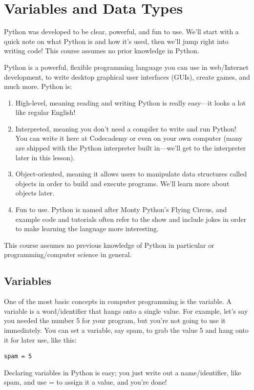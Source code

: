\documentclass[12pt,a4paper,final,twoside,onecolumn,titlepage]{book}
\begin{document}
\section{Variables and Data Types}
Python was developed to be clear, powerful, and fun to use. We'll start with a quick note on what Python is and how it's used, then we'll jump right into writing code! This course assumes no prior knowledge in Python.

Python is a powerful, flexible programming language you can use in web/Internet development, to write desktop graphical user interfaces (GUIs), create games, and much more. Python is:
\begin{enumerate}
\item High-level, meaning reading and writing Python is really easy—it looks a lot like regular English!
\item Interpreted, meaning you don't need a compiler to write and run Python! You can write it here at Codecademy or even on your own computer (many are shipped with the Python interpreter built in—we'll get to the interpreter later in this lesson).
\item Object-oriented, meaning it allows users to manipulate data structures called objects in order to build and execute programs. We'll learn more about objects later.
\item Fun to use. Python is named after Monty Python's Flying Circus, and example code and tutorials often refer to the show and include jokes in order to make learning the language more interesting.
\end{enumerate}
This course assumes no previous knowledge of Python in particular or programming/computer science in general.

\subsection{Variables}
One of the most basic concepts in computer programming is the variable. A variable is a word/identifier that hangs onto a single value. For example, let's say you needed the number 5 for your program, but you're not going to use it immediately. You can set a variable, say spam, to grab the value 5 and hang onto it for later use, like this:
\begin{lstlisting}
spam = 5
\end{lstlisting}
Declaring variables in Python is easy; you just write out a name/identifier, like spam, and use = to assign it a value, and you're done!
\end{document}
